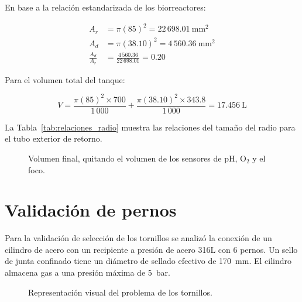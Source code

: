 \documentclass[11pt,tesis,twoside,openright,spanish]{upiiztt}
\begin{document}
En base a la relación estandarizada de los biorreactores:

\begin{align}
A_r &= \pi(85)^2 = 22\,698.01\ \text{mm}^2 \\
A_d &= \pi(38.10)^2 = 4\,560.36\ \text{mm}^2 \\
\frac{A_d}{A_r} &= \frac{4\,560.36}{22\,698.01} = 0.20
\end{align}

Para el volumen total del tanque:

\begin{equation}
V = \frac{\pi(85)^2 \times 700}{1\,000} + \frac{\pi(38.10)^2 \times 343.8}{1\,000} = 17.456\ \text{L}
\end{equation}

La Tabla~\ref{tab:relaciones_radio} muestra las relaciones del tamaño del radio para el tubo exterior
de retorno.

\begin{table}[H]
\centering
\caption{Tabla de relaciones del tamaño del radio para el tubo exterior de retorno.}
\label{tab:relaciones_radio}
\end{table}

\begin{figure}[H]
  \centering
  \caption{Volumen final, quitando el volumen de los sensores de pH, O$_2$ y el foco.}
  \label{fig:volumen_final}
\end{figure}

\section*{Validación de pernos}

Para la validación de selección de los tornillos se analizó la conexión de un cilindro
de acero con un recipiente a presión de acero 316L con 6 pernos. Un sello de junta
confinado tiene un diámetro de sellado efectivo de 170~mm. El cilindro almacena
gas a una presión máxima de 5~bar.

\begin{figure}[H]
  \centering
  \caption{Representación visual del problema de los tornillos.}
  \label{fig:tornillos}
\end{figure}
\end{document}
